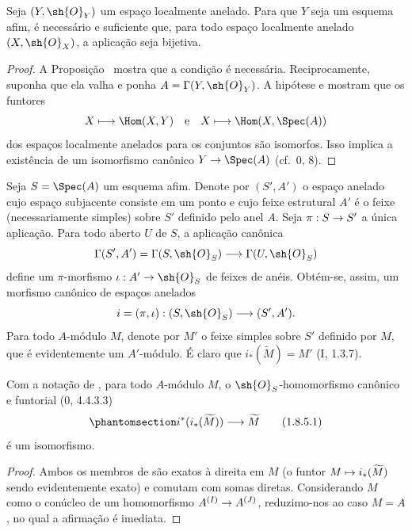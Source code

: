 \documentclass[oneside,10pt]{amsart}
\makeatletter
\newcommand{\ega@arrow}[2]{\mathchoice{#1}{#2}{#2}{#2}}
\let\ega@shortmapsto\mapsto
\renewcommand{\to}{\ega@arrow{\longrightarrow}{\rightarrow}}
\renewcommand{\mapsto}{\ega@arrow{\longmapsto}{\ega@shortmapsto}}
\let\EGAOriginalLabel\label
\renewcommand{\label}[1]{\phantomsection\EGAOriginalLabel{#1}}
\makeatother
\begin{document}
\begin{corollary}[1.8.3]
\label{ega2:addendum:I.1.8.3}
Seja $(Y,\sh{O}_Y)$ um espaço localmente anelado. Para que $Y$ seja um
esquema afim, é necessário e suficiente que, para todo espaço
localmente anelado $(X,\sh{O}_X)$, a aplicação  seja
bijetiva.
\end{corollary}

\begin{proof}
A Proposição~ mostra que a condição é necessária.
Reciprocamente, suponha que ela valha e ponha $A=\Gamma(Y,\sh{O}_Y)$.
A hipótese e  mostram que os funtores
\[
  X\longmapsto\Hom(X,Y)
  \quad\hbox{e}\quad
  X\longmapsto\Hom(X,\Spec(A))
\]
dos espaços localmente anelados para os conjuntos são isomorfos. Isso
implica a existência de um isomorfismo canônico
$Y\to\Spec(A)$ (cf.~0, 8).
\end{proof}

\begin{env}[1.8.4]
\label{ega2:addendum:I.1.8.4}
Seja $S=\Spec(A)$ um esquema afim. Denote por $(S',A')$ o espaço
anelado cujo espaço subjacente consiste em um ponto e cujo feixe
estrutural $A'$ é o feixe (necessariamente simples) sobre $S'$ definido
pelo anel $A$. Seja $\pi:S\to S'$ a única aplicação. Para todo aberto
$U$ de $S$, a aplicação canônica
\[
  \Gamma(S',A')=\Gamma(S,\sh{O}_S)\to\Gamma(U,\sh{O}_S)
\]
define um $\pi$-morfismo $\iota:A'\to\sh{O}_S$ de feixes de anéis.
Obtém-se, assim, um morfismo canônico de espaços anelados
\[
  i=(\pi,\iota):(S,\sh{O}_S)\to(S',A').
\]
Para todo $A$-módulo $M$, denote por $M'$ o feixe simples sobre $S'$
definido por $M$, que é evidentemente um $A'$-módulo. É claro que
$i_*(\widetilde M)=M'$ (I, 1.3.7).
\end{env}

\begin{lemma}[1.8.5]
\label{ega2:addendum:I.1.8.5}
Com a notação de , para todo $A$-módulo $M$, o
$\sh{O}_S$-homomorfismo canônico e funtorial (0, 4.4.3.3)
\begin{equation}
\label{ega2:addendum:I.1.8.5.1}
  i^*(i_*(\widetilde M))\to\widetilde M
\tag{1.8.5.1}
\end{equation}
é um isomorfismo.
\end{lemma}

\begin{proof}
Ambos os membros de  são exatos à direita em $M$ (o
funtor $M\mapsto i_*(\widetilde M)$ sendo evidentemente exato) e
comutam com somas diretas. Considerando $M$ como o conúcleo de um
homomorfismo $A^{(I)}\to A^{(J)}$, reduzimo-nos ao caso $M=A$, no qual
a afirmação é imediata.
\end{proof}
\end{document}
